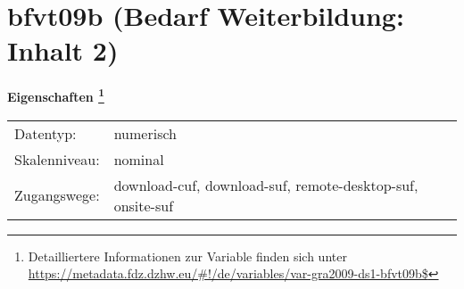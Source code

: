 
    \setcounter{footnote}{0}

    \vspace*{-1.8cm}
	\section{bfvt09b (Bedarf Weiterbildung: Inhalt 2)}
	\label{section:bfvt09b}



    \vspace*{0.5cm}
    \noindent\textbf{Eigenschaften
	\footnote{Detailliertere Informationen zur Variable finden sich unter
		\url{https://metadata.fdz.dzhw.eu/\#!/de/variables/var-gra2009-ds1-bfvt09b$}}}\\
	\begin{tabularx}{\hsize}{@{}lX}
	Datentyp: & numerisch \\
	Skalenniveau: & nominal \\
	Zugangswege: &
	  download-cuf, 
	  download-suf, 
	  remote-desktop-suf, 
	  onsite-suf
 \\
    \end{tabularx}




